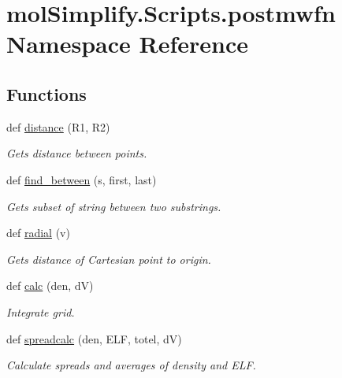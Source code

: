 \hypertarget{namespacemolSimplify_1_1Scripts_1_1postmwfn}{}\section{mol\+Simplify.\+Scripts.\+postmwfn Namespace Reference}
\label{namespacemolSimplify_1_1Scripts_1_1postmwfn}
\subsection*{Functions}
\begin{DoxyCompactItemize}
\item 
def \hyperlink{namespacemolSimplify_1_1Scripts_1_1postmwfn_ada72b25c1943d2ec37349a9e994d19ab}{distance} (R1, R2)
\begin{DoxyCompactList}\small\item\em Gets distance between points. \end{DoxyCompactList}\item 
def \hyperlink{namespacemolSimplify_1_1Scripts_1_1postmwfn_a3ce036a04943095833c3ea8c1a3ebd0a}{find\+\_\+between} (s, first, last)
\begin{DoxyCompactList}\small\item\em Gets subset of string between two substrings. \end{DoxyCompactList}\item 
def \hyperlink{namespacemolSimplify_1_1Scripts_1_1postmwfn_aa6d873258728986e9d51dbfdcd5119f7}{radial} (v)
\begin{DoxyCompactList}\small\item\em Gets distance of Cartesian point to origin. \end{DoxyCompactList}\item 
def \hyperlink{namespacemolSimplify_1_1Scripts_1_1postmwfn_a2c5438051e9d06efd355d34eb5966673}{calc} (den, dV)
\begin{DoxyCompactList}\small\item\em Integrate grid. \end{DoxyCompactList}\item 
def \hyperlink{namespacemolSimplify_1_1Scripts_1_1postmwfn_aaf11b91ca1c7ad0bacc396aee9f93f9e}{spreadcalc} (den, E\+LF, totel, dV)
\begin{DoxyCompactList}\small\item\em Calculate spreads and averages of density and E\+LF. \end{DoxyCompactList}\item 

\end{DoxyCompactItemize}
